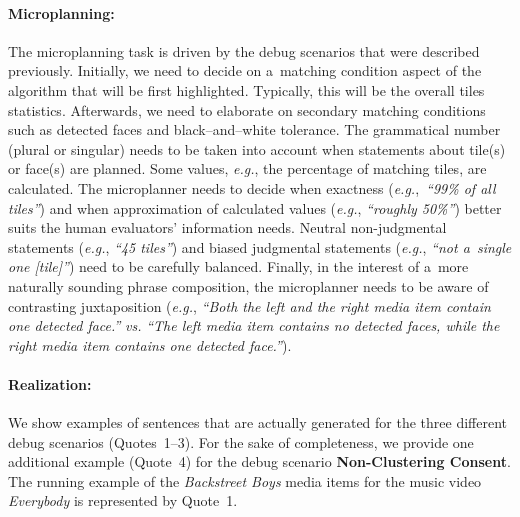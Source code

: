 \paragraph{Microplanning:}

The microplanning task is driven by the debug scenarios
that were described previously.
Initially, we need to decide on a~matching condition aspect
of the algorithm that will be first highlighted.
Typically, this will be the overall tiles statistics.
Afterwards, we need to elaborate on secondary matching conditions
such as detected faces and black--and--white tolerance.
The grammatical number (plural or singular)
needs to be taken into account when statements about tile(s) or face(s)
are planned. Some values, \emph{e.g.},
the percentage of matching tiles, are calculated.
The microplanner needs to decide when exactness
(\emph{e.g.},~\textit{``99\% of all tiles''})
and when approximation of calculated values
(\emph{e.g.}, \textit{``roughly 50\%''}) better suits
the human evaluators' information needs. Neutral non-judgmental statements
(\emph{e.g.}, \textit{``45 tiles''}) and biased judgmental statements
(\emph{e.g.}, \textit{``not a~single one [tile]''})
need to be carefully balanced. Finally, in the interest of
a~more naturally sounding phrase composition,
the microplanner needs to be aware of contrasting juxtaposition
(\emph{e.g.}, \textit{``Both the left and the right media item
contain one detected face.''} \emph{vs.}
\textit{``The left media item contains no detected faces,
while the right media item contains one detected face.''}).

\paragraph{Realization:}

We show examples of sentences that are actually generated
for the three different debug scenarios (Quotes~1--3).
For the sake of completeness, we provide one additional example
(Quote~4) for the debug scenario \textbf{Non-Clustering Consent}.
The running example of the \emph{Backstreet Boys} media items
for the music video \emph{Everybody} is represented by Quote~1.

